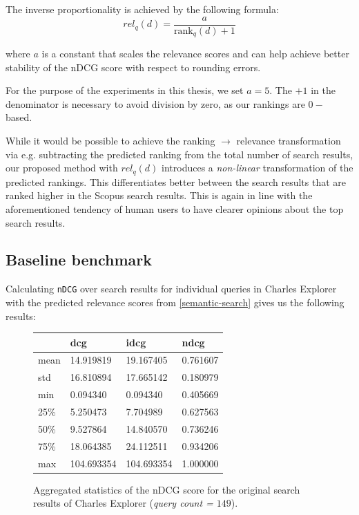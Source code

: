 The inverse proportionality is achieved by the following formula:
\[rel_q(d) = \frac{a}{\text{rank}_q(d) + 1}\]

where $a$ is a constant that scales the relevance scores and can help achieve better 
stability of the nDCG score with respect to rounding errors.

For the purpose of the experiments in this thesis, we set $a = 5$. 
The $+1$ in the denominator is necessary to avoid division by zero, as our rankings are $0-$ based.

While it would be possible to achieve the ranking $\rightarrow$ relevance transformation via e.g. subtracting the predicted ranking from the total number of search results, 
our proposed method with $rel_q(d)$ introduces a \textit{non-linear} transformation of the predicted rankings. 
This differentiates better between the search results that are ranked higher in the Scopus search results. 
This is again in line with the aforementioned tendency of human users to have clearer opinions about the top search results.

\subsection{Baseline benchmark}\label{baseline-benchmark}

Calculating \texttt{nDCG} over search results for individual queries in
Charles Explorer with the predicted relevance scores from \ref{semantic-search} gives us the following results:

\begin{figure}[!ht]
    \captionsetup{width=.9\linewidth}
    \centering
    \begin{tabular}{|l|l|l|l|}
    \hline
        ~ & dcg & idcg & ndcg \\ \hline
        mean & 14.919819 & 19.167405 & 0.761607 \\ \hline
        std & 16.810894 & 17.665142 & 0.180979 \\ \hline
        min & 0.094340 & 0.094340 & 0.405669 \\ \hline
        25\% & 5.250473 & 7.704989 & 0.627563 \\ \hline
        50\% & 9.527864 & 14.840570 & 0.736246 \\ \hline
        75\% & 18.064385 & 24.112511 & 0.934206 \\ \hline
        max & 104.693354 & 104.693354 & 1.000000 \\ \hline
    \end{tabular}
    \caption{Aggregated statistics of the nDCG score for the original search results of Charles Explorer (\textit{query count = $149$}).}
\end{figure}

